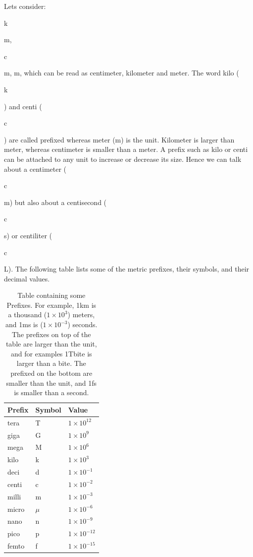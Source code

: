 \documentclass[main.tex]{subfiles}
\begin{document}
Let\textquotesingle s consider: \begin{bf}k\end{bf}m, \begin{bf}c\end{bf}m, m, which can be read as centimeter, kilometer and meter. The word kilo (\begin{bf}k\end{bf}) and centi (\begin{bf}c\end{bf}) are called prefixed whereas meter (m) is the unit. Kilometer is larger than meter, whereas centimeter is smaller than a meter. A prefix such as kilo or centi can be attached to any unit to increase or decrease its size. Hence we can talk about a centimeter (\begin{bf}c\end{bf}m) but also about a centisecond (\begin{bf}c\end{bf}s) or centiliter (\begin{bf}c\end{bf}L). The following table lists some of the metric prefixes, their symbols, and their decimal values.

\begin{table}[ht]
\centering
{}\selectfont
\begin{tabular}{lll}
\rowcolor{black!45}
\toprule
Prefix & Symbol & Value \\
\midrule
tera & T  &$1\times10^{12}$  \\
giga & G  &$1\times10^9$  \\
mega & M  &$1\times10^6$  \\
kilo & k  &$1\times10^3$  \\
\midrule
deci & d  &$1\times10^{-1}$  \\
centi & c  &$1\times10^{-2}$  \\
milli & m  &$1\times10^{-3}$  \\
micro & $\mu$  &$1\times10^{-6}$  \\
nano & n  &$1\times10^{-9}$  \\
pico & p  &$1\times10^{-12}$  \\
femto & f  &$1\times10^{-15}$  \\
\bottomrule
\end{tabular}
\caption{Table containing some Prefixes. For example, 1km is a thousand ($1\times 10^{3}$) meters, and 1ms is ($1\times 10^{-3}$) seconds. The prefixes on top of the table are larger than the unit, and for examples 1Tbite is larger than a bite. The prefixed on the bottom are smaller than the unit, and 1fs is smaller than a second.}
\label{table1:2}
\end{table}
\end{document}
